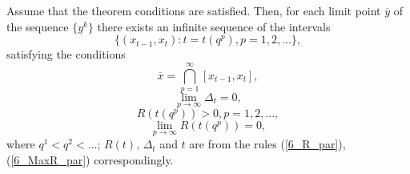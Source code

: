 \begin{lemma}
Assume that the theorem conditions are satisfied. Then, for each limit point $\overline{y}$ of the sequence $\{y^k\}$ there exists an infinite sequence of the intervals 
	\begin{equation}\label{6_intervals}
	\{ \left( x_{t-1}, x_t\right): t=t(q^p), p=1,2,...	\},
	\end{equation}
	satisfying the conditions 
	\[
	\overline{x} = \bigcap_{p=1}^\infty\left[x_{t-1},x_t\right],
	\]
	\begin{equation}\label{6_limdelta}
	\lim_{p\rightarrow\infty}{\Delta_t} = 0,
	\end{equation}
	\begin{equation}\label{6_Rg0}
	R(t(q^p))>0, p=1,2,...,
	\end{equation}
	\begin{equation}\label{6_limR}
	\lim_{p\rightarrow\infty} R(t(q^p))=0,
	\end{equation}
where $q^1<q^2<...$; $R(t)$, $\Delta_t$ and $t$ are from the rules (\ref{6_R_par}), (\ref{6_MaxR_par}) correspondingly.
\end{lemma}
